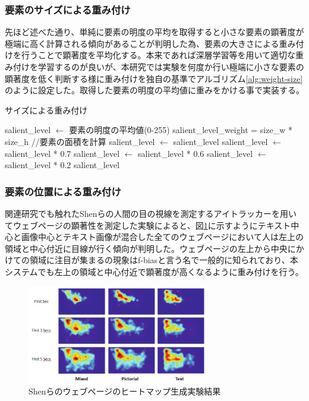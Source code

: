 \subsubsection{要素のサイズによる重み付け}\label{subsec:system03-1}
\par 先ほど述べた通り、単純に要素の明度の平均を取得すると小さな要素の顕著度が極端に高く計算される傾向があることが判明した為、要素の大きさによる重み付けを行うことで顕著度を平均化する。本来であれば深層学習等を用いて適切な重み付けを学習するのが良いが、本研究では実験を何度か行い極端に小さな要素の顕著度を低く判断する様に重み付けを独自の基準でアルゴリズム\ref{alg:weight-size}のように設定した。取得した要素の明度の平均値に重みをかける事で実装する。

\begin{algorithm}[H]
    \caption{サイズによる重み付け}
    \label{alg:weight-size}
    \begin{algorithmic}
    \State salient\_level $ \leftarrow $ 要素の明度の平均値(0-255)
    \State salient\_level\_weight = size\_w * size\_h //要素の面積を計算
        \State salient\_level $ \leftarrow $ salient\_level
        \State salient\_level $ \leftarrow $ salient\_level * 0.7
        \State salient\_level $ \leftarrow $ salient\_level * 0.6
    \Else
        \State salient\_level $ \leftarrow $ salient\_level * 0.2
    \EndIf
    \State \Return salient\_level
    \EndFunction
    \end{algorithmic}
\end{algorithm}

\subsubsection{要素の位置による重み付け}\label{subsec:system03-1}
\par 関連研究でも触れたShenら\cite{shen2014webpage}の人間の目の視線を測定するアイトラッカーを用いてウェブページの顕著性を測定した実験によると、図\ref{fig_shen-experience}に示すようにテキスト中心と画像中心とテキスト画像が混合した全てのウェブページにおいて人は左上の領域と中心付近に目線が行く傾向が判明した。ウェブページの左上から中央にかけての領域に注目が集まるの現象はf-biasと言う名で一般的に知られており、本システムでも左上の領域と中心付近で顕著度が高くなるように重み付けを行う。

\begin{figure}[H]
    \centering
    \includegraphics[width=8cm]{figures/shen-bias.png}
    \caption{Shenらのウェブページのヒートマップ生成実験結果\cite{shen2014webpage}}
    \label{fig_shen-experience}
\end{figure}

